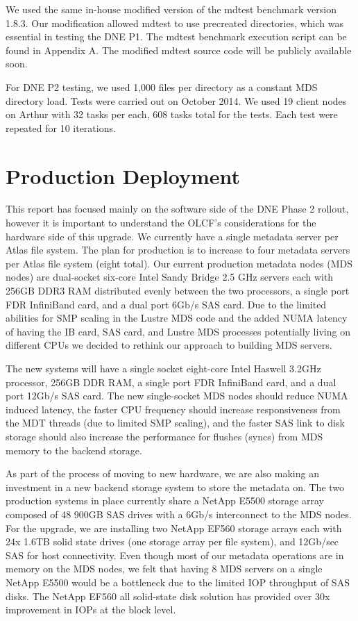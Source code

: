 \documentclass[conference,compsoc]{IEEEtran}
\begin{document}
We used the same in-house modified version of the mdtest benchmark version
1.8.3. Our modification allowed mdtest to use precreated directories, which was
essential in testing the DNE P1. The mdtest benchmark execution script can be
found in Appendix A. The modified mdtest source code will be publicly available
soon.

For DNE P2 testing, we used 1,000 files per directory as a constant MDS
directory load. Tests were carried out on October 2014. We used 19 client nodes
on Arthur with 32 tasks per each, 608 tasks total for the tests. Each test were
repeated for 10 iterations.


\section{Production Deployment}

This report has focused mainly on the software side of the DNE Phase 2 rollout,
however it is important to understand the OLCF’s considerations for the
hardware side of this upgrade. We currently have a single metadata server per
Atlas file system. The plan for production is to increase to four metadata
servers per Atlas file system (eight total). Our current production metadata
nodes (MDS nodes) are dual-socket six-core Intel Sandy Bridge 2.5 GHz servers
each with 256GB DDR3 RAM distributed evenly between the two processors, a
single port FDR InfiniBand card, and a dual port 6Gb/s SAS card. Due to the
limited abilities for SMP scaling in the Lustre MDS code and the added NUMA
latency of having the IB card, SAS card, and Lustre MDS processes potentially
living on different CPUs we decided to rethink our approach to building MDS
servers.

The new systems will have a single socket eight-core Intel Haswell 3.2GHz
processor, 256GB DDR RAM, a single port FDR InfiniBand card, and a dual port
12Gb/s SAS card. The new single-socket MDS nodes should reduce NUMA induced
latency, the faster CPU frequency should increase responsiveness from the MDT
threads (due to limited SMP scaling), and the faster SAS link to disk storage
should also increase the performance for flushes (syncs) from MDS memory to the
backend storage.

As part of the process of moving to new hardware, we are also making an
investment in a new backend storage system to store the metadata on. The two
production systems in place currently share a NetApp E5500 storage array
composed of 48 900GB SAS drives with a 6Gb/s interconnect to the MDS nodes. For
the upgrade, we are installing two NetApp EF560 storage arrays each with 24x
1.6TB solid state drives (one storage array per file system), and 12Gb/sec SAS
for host connectivity. Even though most of our metadata operations are in
memory on the MDS nodes, we felt that having 8 MDS servers on a single NetApp
E5500 would be a bottleneck due to the limited IOP throughput of SAS disks. The
NetApp EF560 all solid-state disk solution has provided over 30x improvement in
IOPs at the block level.
\end{document}
